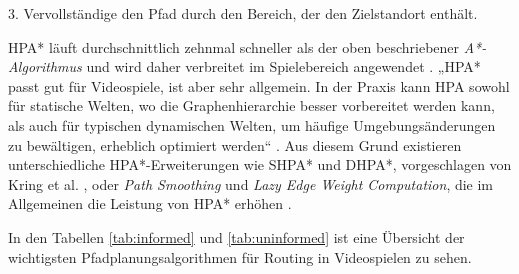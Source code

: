 3. Vervollständige den Pfad durch den Bereich, der den Zielstandort enthält.\\

\begin{sloppypar}
HPA* läuft durchschnittlich zehnmal schneller als der oben beschriebener\textit{ A*-Algorithmus} \cite[S.1, 26]{Bot04} und wird daher verbreitet im Spielebereich angewendet \cite{LSC08}. „HPA* passt gut für Videospiele, ist aber sehr allgemein. In der Praxis kann HPA sowohl für statische Welten, wo die Graphenhierarchie besser vorbereitet werden kann, als auch für typischen dynamischen Welten, um häufige Umgebungsänderungen zu bewältigen, erheblich optimiert werden“ \cite[S.39]{Kri10}. Aus diesem Grund existieren unterschiedliche HPA*-Erweiterungen wie SHPA* und DHPA*, vorgeschlagen von Kring et al. \cite[S.40ff.]{Kri10}, oder \textit{Path Smoothing} und \textit{Lazy Edge Weight Computation}, die im Allgemeinen die Leistung von HPA* erhöhen \cite{JB07}.
\end{sloppypar}

In den Tabellen \ref{tab:informed} und \ref{tab:uninformed} ist eine Übersicht der wichtigsten Pfadplanungsalgorithmen für Routing in Videospielen zu sehen.


